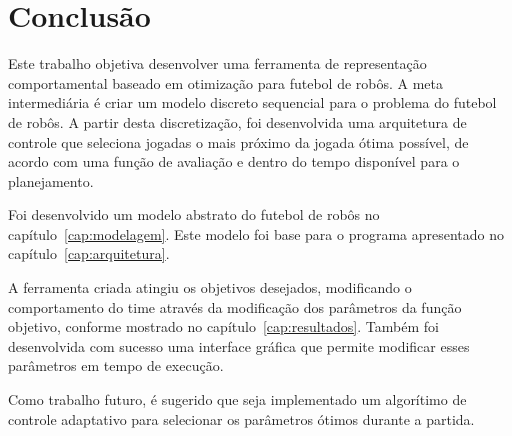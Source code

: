 \chapter*{Conclusão}\label{cap:conclusao}

Este trabalho objetiva desenvolver uma ferramenta de representação
comportamental baseado em otimização para futebol de robôs.
A meta intermediária é criar um modelo discreto sequencial
para o problema do futebol de robôs. A partir desta
discretização, foi desenvolvida uma arquitetura de controle
que seleciona jogadas o mais próximo da jogada ótima possível,
de acordo com uma função de avaliação e dentro do tempo disponível
para o planejamento.

Foi desenvolvido um modelo abstrato do futebol de robôs no
capítulo~\ref{cap:modelagem}. Este modelo foi base para o
programa apresentado no capítulo~\ref{cap:arquitetura}.

A ferramenta criada atingiu os objetivos desejados, modificando o
comportamento do time através da modificação dos parâmetros da função
objetivo, conforme mostrado no capítulo~\ref{cap:resultados}. Também foi
desenvolvida com sucesso uma interface gráfica que permite modificar
esses parâmetros em tempo de execução.

Como trabalho futuro, é sugerido que seja implementado 
um algorítimo de controle adaptativo para selecionar os
parâmetros ótimos durante a partida.

